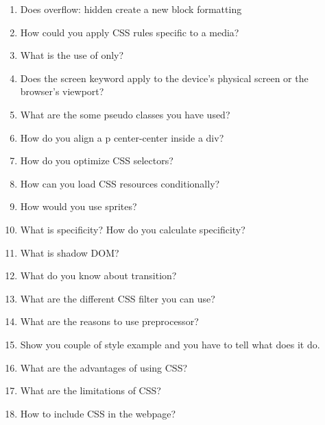 \documentclass[11pt]{article}
\begin{document}
\begin{enumerate}
\item Does overflow: hidden create a new block formatting
\item How could you apply CSS rules specific to a media?
\item What is the use of only?
\item Does the screen keyword apply to the device's physical screen or the browser's viewport?
\item What are the some pseudo classes you have used?
\item How do you align a p center-center inside a div?
\item How do you optimize CSS selectors?
\item How can you load CSS resources conditionally?
\item How would you use sprites?
\item What is specificity? How do you calculate specificity?
\item What is shadow DOM?
\item What do you know about transition?
\item What are the different CSS filter you can use?
\item What are the reasons to use preprocessor?
\item Show you couple of style example and you have to tell what does it do.
\item What are the advantages of using CSS?
\item What are the limitations of CSS?
\item How to include CSS in the webpage?
\end{enumerate}
\end{document}

